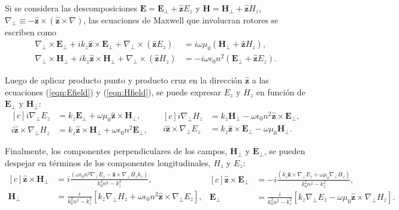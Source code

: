 Si se considera las descomposiciones $\textbf{E}=\textbf{E}_\perp +\hat{\textbf{z}} E_z$ y $\textbf{H}=\textbf{H}_\perp +\hat{\textbf{z}} H_z$, $\nabla_\perp \equiv - \hat{\textbf{z}}\times (\hat{\textbf{z}}\times\nabla)   $, las ecuaciones de Maxwell que involucran rotores se escriben como
\begin{align}
	\nabla_\perp \times  \textbf{E}_\perp + ik_z \hat{\textbf{z}} \times \textbf{E}_\perp + \nabla_\perp \times (\hat{\textbf{z}} E_z) &= i\omega\mu_0(\textbf{H}_\perp +\hat{\textbf{z}} H_z),
	\label{eqn:Efield}
	\\
	\nabla_\perp \times  \textbf{H}_\perp + ik_z \hat{\textbf{z}} \times \textbf{H}_\perp + \nabla_\perp \times (\hat{\textbf{z}} H_z) &= -i\omega \epsilon_0 n^2 (\textbf{E}_\perp +\hat{\textbf{z}} E_z).
	\label{eqn:Hfield}
\end{align}

Luego de aplicar producto punto y producto cruz en la dirección $\hat{\textbf{z}}$ a las ecuaciones (\ref{eqn:Efield}) y (\ref{eqn:Hfield}), se puede expresar $E_z$ y $H_z$ en función de $\textbf{E}_\perp$ y $\textbf{H}_\perp$:
\begin{equation*}
\begin{aligned}[c]
	 i\nabla_\perp E_z &= k_z\textbf{E}_\perp +\omega \mu_0 \hat{\textbf{z}} \times \textbf{H}_\perp  ,
	 	  	 \\
	 	  	i\hat{\textbf{z}} \times \nabla_\perp H_z &= k_z \hat{\textbf{z}} \times\textbf{H}_\perp + \omega\epsilon_0 n^2 \textbf{E}_\perp,
\end{aligned} 
\quad
\begin{aligned}[c]
	i \nabla_\perp H_z &= k_z \textbf{H}_\perp - \omega \epsilon_0 n^2  \hat{\textbf{z}} \times \textbf{E}_\perp ,
	\\
	i\hat{\textbf{z}} \times\nabla_\perp E_z &= k_z  \hat{\textbf{z}} \times \textbf{E}_\perp - \omega \mu_0 \textbf{H}_\perp.
\end{aligned}
\end{equation*}

Finalmente, los componentes perpendiculares de los campos, $\textbf{H}_\perp$ y $\textbf{E}_\perp$, se pueden despejar en términos de los componentes longitudinales, $H_z$ y $E_z$:
\begin{equation}
\begin{aligned}[c]
 \hat{\textbf{z}} \times \textbf{H}_\perp &= i\frac{(\omega\epsilon_0 n^2 \nabla_\perp E_z  - \hat{\textbf{z}} \times \nabla_\perp H_z k_z)}{k_0^2 n^2 - k_z^2},
 \\
\textbf{H}_\perp &= \frac{i}{k_0^2 n^2 - k_z^2}\left[k_z\nabla_\perp H_z + \omega \epsilon_0 n^2\hat{\textbf{z}} \times \nabla_\perp E_z\right],
\end{aligned}
\begin{aligned}[c]
	\hat{\textbf{z}} \times \textbf{E}_\perp &= -i\frac{(k_z\hat{\textbf{z}} \times \nabla_\perp E_z + \omega\mu_0 \nabla_\perp H_z)  }{k_0^2 n^2 - k_z^2},
	\\
\textbf{E}_\perp &= \frac{i}{k_0^2 n^2 - k_z^2}\left[k_z \nabla_\perp E_z - \omega\mu_0 \hat{\textbf{z}} \times \nabla_\perp H_z\right]. \label{eqn:transversal}
\end{aligned}
\end{equation}

